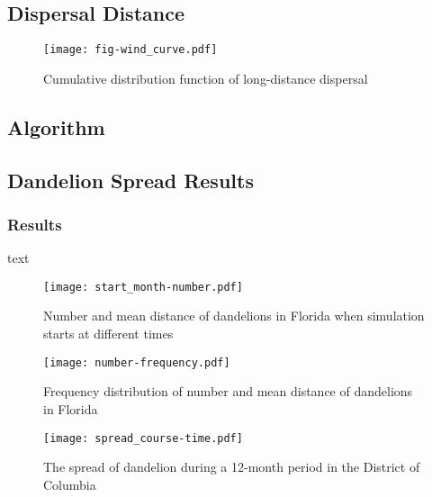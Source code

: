 \documentclass[12pt]{article}
\begin{document}
	\subsection{Dispersal Distance}
		
		\begin{figure}
			\centering
			\texttt{[image: fig-wind\_curve.pdf]}
			\caption{Cumulative distribution function of long-distance dispersal}
			\label{fig:longDistance}
		\end{figure}
		
	\subsection{Algorithm}
	
	\subsection{Dandelion Spread Results}
	
		\subsubsection{Results}
		
			text
			
			\begin{figure}
				\centering
				\texttt{[image: start\_month-number.pdf]}
				\caption{Number and mean distance of dandelions in Florida when simulation starts at different times}
				\label{fig:start}
			\end{figure}
			
			\begin{figure}
				\centering
				\texttt{[image: number-frequency.pdf]}
				\caption{Frequency distribution of number and mean distance of dandelions in Florida}
				\label{fig:freqDand}
			\end{figure}
			
			
			\begin{figure}
				\centering
				\texttt{[image: spread\_course-time.pdf]}
				\caption{The spread of dandelion during a 12-month period in the District of Columbia}
				\label{fig:spreadDC}
			\end{figure}
			
\end{document}

